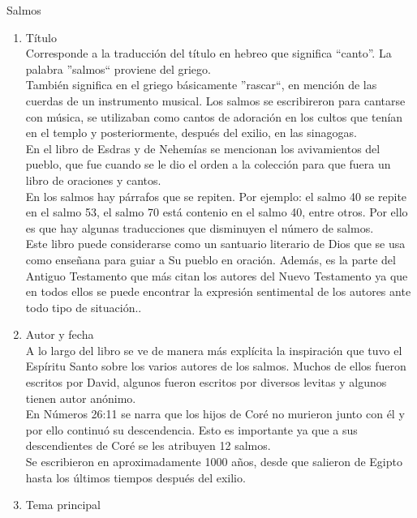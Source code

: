 %
%
\begin{section}{Salmos}
	\begin{enumerate}
		\item Título\\
			Corresponde a la traducción del título en hebreo que significa ``canto''. La palabra ''salmos`` proviene del griego.\\
			       También significa en el griego básicamente ''rascar``, en mención de las cuerdas de un instrumento musical. Los salmos se escribireron para cantarse con música, se utilizaban como cantos de adoración en los cultos que tenían en el templo y posteriormente, después del exilio, en las sinagogas.\\
			En el libro de Esdras y de Nehemías se mencionan los avivamientos del pueblo, que fue cuando se le dio el orden a la colección para que fuera un libro de oraciones y cantos. \\
			En los salmos hay párrafos que se repiten. Por ejemplo: el salmo 40 se repite en el salmo 53, el salmo 70 está contenio en el salmo 40, entre otros. Por ello es que hay algunas traducciones que disminuyen el número de salmos. \\
			Este libro puede considerarse como un santuario literario de Dios que se usa como enseñana para guiar a Su pueblo en oración. Además, es la parte del Antiguo Testamento que más citan los autores del Nuevo Testamento ya que en todos ellos se puede encontrar la expresión sentimental de los autores ante todo tipo de situación.. 
		\item Autor y fecha\\
			A lo largo del libro se ve de manera más explícita la inspiración que tuvo el Espíritu Santo sobre los varios autores de los salmos. Muchos de ellos fueron escritos por David, algunos fueron escritos por diversos levitas y algunos tienen autor anónimo. \\
			En Números 26:11 se narra que los hijos de Coré no murieron junto con él y por ello continuó su descendencia. Esto es importante ya que a sus descendientes de Coré se les atribuyen 12 salmos.\\
			Se escribieron en aproximadamente 1000 años, desde que salieron de Egipto hasta los últimos tiempos después del exilio.
		\item Tema principal\\

\end{enumerate}
\end{section}
